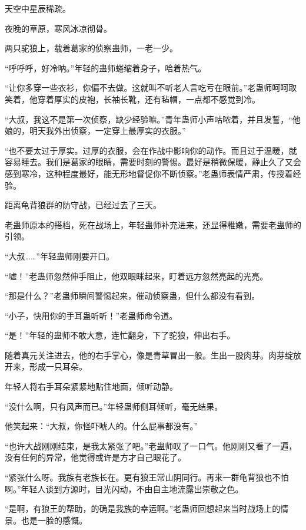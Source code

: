 
\begin{this_body}



天空中星辰稀疏。

夜晚的草原，寒风冰凉彻骨。

两只驼狼上，载着葛家的侦察蛊师，一老一少。

“呼呼呼，好冷呐。”年轻的蛊师蜷缩着身子，哈着热气。

“让你多穿一些衣衫，你偏不去做。这就叫不听老人言吃亏在眼前。”老蛊师呵呵取笑着，他穿着厚实的皮袍，长袖长靴，还有毡帽，一点都不感觉到冷。

“大叔，我这不是第一次侦察，缺少经验嘛。”青年蛊师小声咕哝着，并且发誓，“他娘的，明天我外出侦察，一定穿上最厚实的衣服。”

“也不要太过于厚实。过厚的衣服，会在作战中影响你的动作。而且过于温暖，就容易睡去。我们是葛家的眼睛，需要时刻的警惕。最好是稍微保暖，静止久了又会感到寒冷，这种程度最好，能无形地督促你不断侦察。”老蛊师表情严肃，传授着经验。

距离龟背狼群的防守战，已经过去了三天。

老蛊师原本的搭档，死在战场上，年轻蛊师补充进来，还显得稚嫩，需要老蛊师的引领。

“大叔……”年轻蛊师刚要开口。

“嘘！”老蛊师忽然伸手阻止，他双眼眯起来，盯着远方忽然亮起的光亮。

“那是什么？”老蛊师瞬间警惕起来，催动侦察蛊，但什么都没有看到。

“小子，快用你的手耳蛊听听！”老蛊师命令道。

“是！”年轻的蛊师不敢大意，连忙翻身，下了驼狼，伸出右手。

随着真元关注进去，他的右手掌心，像是青草冒出一般。生出一股肉芽。肉芽绽放开来，形成一只耳朵。

年轻人将右手耳朵紧紧地贴住地面，倾听动静。

“没什么啊，只有风声而已。”年轻蛊师侧耳倾听，毫无结果。

他笑起来：“大叔，你怪吓唬人的。什么屁事都没有。”

“也许大战刚刚结束，是我太紧张了吧。”老蛊师叹了一口气。他刚刚又看了一遍，没有任何的异常，他觉得或许是方才自己眼花了。

“紧张什么呀。我族有老族长在。更有狼王常山阴同行。再来一群龟背狼也不怕啊。”年轻人谈到方源时，目光闪动，不由自主地流露出崇敬之色。

“是啊，有狼王的帮助，的确是我族的幸运啊。”老蛊师回想起来当时战场上的情景。也是一脸的感慨。


\end{this_body}
